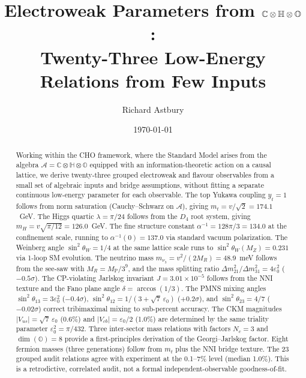 \documentclass[12pt,a4paper]{article}
\title{Electroweak Parameters from $\Comp\otimes\Quat\otimes\Oct$:\\
Twenty-Three Low-Energy Relations from Few Inputs}
\author{Richard Astbury}
\date{\today}
\theoremstyle{definition}
\theoremstyle{remark}
\newcommand{\Oct}{\mathbb{O}}
\newcommand{\Quat}{\mathbb{H}}
\newcommand{\Comp}{\mathbb{C}}
\newcommand{\Alg}{\mathcal{A}}
\newcommand{\MP}{M_{\mathrm{P}}}
\newcommand{\MR}{M_R}
\begin{document}
\maketitle

\begin{abstract}
Working within the CHO framework, where the Standard Model arises from the 
algebra $\Alg = \Comp\otimes\Quat\otimes\Oct$ equipped with an information-theoretic 
action on a causal lattice, we derive twenty-three grouped electroweak and flavour observables 
from a small set of algebraic inputs and bridge assumptions, without fitting a 
separate continuous low-energy parameter for each observable. The top Yukawa coupling $y_t = 1$ 
follows from norm saturation (Cauchy--Schwarz on $\Alg$), giving 
$m_t = v/\sqrt{2} = 174.1$~GeV. The Higgs quartic $\lambda = \pi/24$ follows 
from the $D_4$ root system, giving $m_H = v\sqrt{\pi/12} = 126.0$~GeV. The fine 
structure constant $\alpha^{-1} = 128\pi/3 = 134.0$ at the confinement scale, 
running to $\alpha^{-1}(0) = 137.0$ via standard vacuum polarization. The 
Weinberg angle $\sin^2\theta_W = 1/4$ at the same lattice scale runs to 
$\sin^2\theta_W(M_Z) = 0.231$ via 1-loop SM evolution. The neutrino mass 
$m_{\nu_3} = v^2/(2\MR) = 48.9$~meV follows from the see-saw with 
$\MR = \MP/3^9$, and the mass splitting ratio 
$\Delta m^2_{21}/\Delta m^2_{31} = 4\varepsilon_0^2$ ($-0.5\sigma$). 
The CP-violating Jarlskog invariant 
$J = 3.01\times 10^{-5}$ 
follows from the NNI texture and the Fano plane angle $\delta = \arccos(1/3)$. 
The PMNS mixing angles $\sin^2\theta_{13} = 3\varepsilon_0^2$ ($-0.4\sigma$), 
$\sin^2\theta_{12} = 1/(3+\sqrt{7}\,\varepsilon_0)$ ($+0.2\sigma$), and 
$\sin^2\theta_{23} = 4/7$ ($-0.02\sigma$) correct tribimaximal mixing to 
sub-percent accuracy. The CKM magnitudes $|V_{us}| = \sqrt{7}\,\varepsilon_0$ 
(0.6\%) and $|V_{cb}| = \varepsilon_0/2$ (1.0\%) are determined by the same 
triality parameter $\varepsilon_0^2 = \pi/432$. 
Three inter-sector mass relations with factors 
$N_c = 3$ and $\dim(\Oct) = 8$ provide a first-principles derivation of the 
Georgi--Jarlskog factor. Eight fermion masses (three generations) follow from 
$m_t$ plus the NNI bridge texture. The 23 grouped audit relations agree with 
experiment at the 0.1--7\% level (median 1.0\%). This is a retrodictive, 
correlated audit, not a formal independent-observable goodness-of-fit.
\end{abstract}

\tableofcontents

\end{document}
